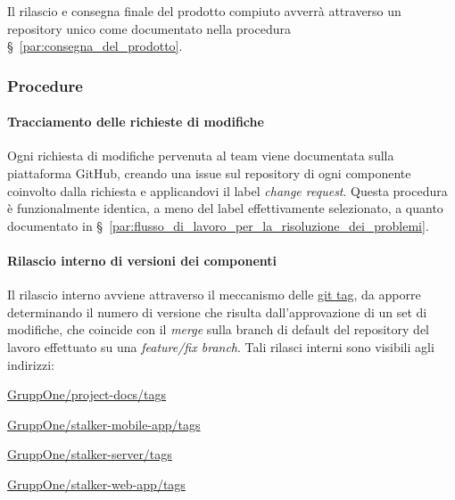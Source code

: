\documentclass[../../norme-di-progetto.tex]{subfiles}
\begin{document}
Il rilascio e consegna finale del prodotto compiuto avverrà attraverso un repository unico come documentato nella procedura §~\ref{par:consegna_del_prodotto}.



\subsubsection{Procedure}%
\label{subs:gestione_della_configurazione/procedure}

\paragraph{Tracciamento delle richieste di modifiche}%
\label{par:tracciamento_delle_richieste_di_modifiche}

Ogni richiesta di modifiche pervenuta al team viene documentata sulla piattaforma GitHub, creando una issue sul repository di ogni componente coinvolto dalla richiesta e applicandovi il label \textit{change request}.
Questa procedura è funzionalmente identica, a meno del label effettivamente selezionato, a quanto documentato in §~\ref{par:flusso_di_lavoro_per_la_risoluzione_dei_problemi}.


\paragraph{Rilascio interno di versioni dei componenti}%
\label{par:rilascio_interno_di_versioni_dei_componenti}

Il rilascio interno avviene attraverso il meccanismo delle \href{https://git-scm.com/book/en/v2/Git-Basics-Tagging}{git tag}, da apporre determinando il numero di versione che risulta dall'approvazione di un set di modifiche, che coincide con il \textit{merge} sulla branch di default del repository del lavoro effettuato su una \textit{feature/fix branch}. Tali rilasci interni sono visibili agli indirizzi:

\begin{description}
  \item \href{https://github.com/GruppOne/project-docs/tags}{GruppOne/project-docs/tags}
  \item \href{https://github.com/GruppOne/stalker-mobile-app/tags}{GruppOne/stalker-mobile-app/tags}
  \item \href{https://github.com/GruppOne/stalker-server/tags}{GruppOne/stalker-server/tags}
  \item \href{https://github.com/GruppOne/stalker-web-app/tags}{GruppOne/stalker-web-app/tags}
\end{description}
\end{document}

